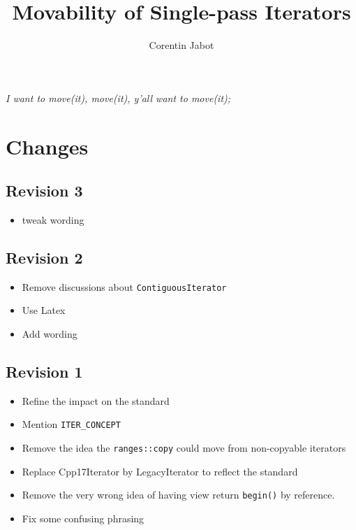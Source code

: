 \documentclass{wg21}
\title{Movability of Single-pass Iterators}
\author{Corentin Jabot}{corentin.jabot@gmail.com}
\begin{document}
\maketitle

\begin{flushright}
\hfill \break
\hfill \break
\textit{I want to move(it), move(it), y'all want to move(it);}
\end{flushright}

\hypertarget{changes}{%
	\section{Changes}\label{changes}}

\hypertarget{revision-3}{%
	\subsection{Revision 3}\label{revision-3}}

\begin{itemize}
	\item tweak wording
\end{itemize}

\hypertarget{revision-2}{%
	\subsection{Revision 2}\label{revision-2}}

\begin{itemize}
	\item Remove discussions about \texttt{ContiguousIterator}
	\item Use Latex
	\item Add wording
\end{itemize}

\hypertarget{revision-1}{%
	\subsection{Revision 1}\label{revision-1}}

\begin{itemize}
	\item
	Refine the impact on the standard
	\item
	Mention \texttt{ITER\_CONCEPT}
	\item
	Remove the idea the \texttt{ranges::copy} could move from non-copyable
	iterators
	\item
	Replace Cpp17Iterator by LegacyIterator to reflect the standard
	\item
	Remove the very wrong idea of having view return \texttt{begin()} by
	reference.
	\item
	Fix some confusing phrasing
\end{itemize}
\end{document}
